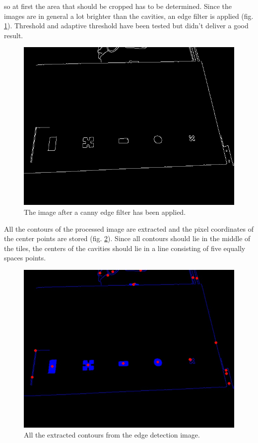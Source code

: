 \documentclass{article}
\begin{document}
so at first the area that should be cropped has to be determined. Since the images are in general a lot brighter than the cavities, an edge filter is applied (fig. \ref{fig:edges}). Threshold and adaptive threshold have been tested but didn't deliver a good result.\\
\begin{figure}[h!]
\centering
\includegraphics[scale=0.3]{images/edges.jpg}
\caption{The image after a canny edge filter has been applied.}
\label{fig:edges}
\end{figure}
All the contours of the processed image are extracted and the pixel coordinates of the center points are stored (fig. \ref{fig:cavities}). Since all contours should lie in the middle of the tiles, the centers of the cavities should lie in a line consisting of five equally spaces points. \\
\begin{figure}[h!]
\centering
\includegraphics[scale=0.3]{images/cavitycontours.jpg}
\caption{All the extracted contours from the edge detection image.}
\label{fig:cavities}
\end{figure}
\end{document}
